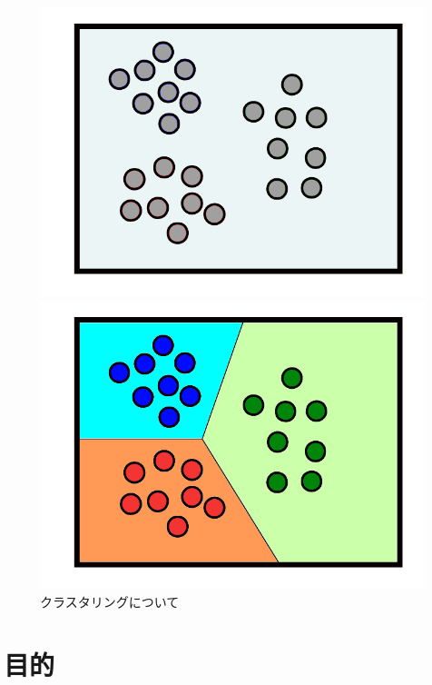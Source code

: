 \documentclass[a4j,12pt,dvipdfmx,oneside]{jsbook}
\theoremstyle{definition}
\begin{document}
 \begin{figure}[htbp]
  \centering
  \begin{minipage}{0.4\hsize}
   \includegraphics[width=\linewidth]{before_clustering.pdf}
  \end{minipage}
  \begin{minipage}{0.4\hsize}
   \includegraphics[width=\linewidth]{after_clustering.pdf}
  \end{minipage}
  \caption{クラスタリングについて}
  \label{fig:about_clustering}
 \end{figure}

 \newpage
 
 \section{目的}\label{sec:purpose}
\end{document}
